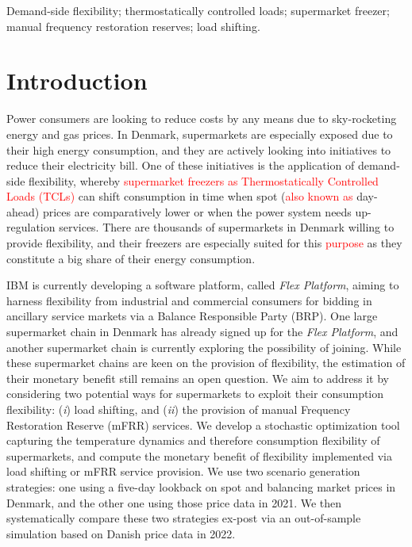 \documentclass[11pt,a4paper]{article}
\begin{document}
Demand-side flexibility; thermostatically controlled loads; supermarket freezer; manual frequency restoration reserves; load shifting.

\section{Introduction}


Power consumers are looking to reduce costs by any means due to sky-rocketing energy and gas prices. In Denmark, supermarkets are especially exposed due to their high energy consumption, and they are actively looking into initiatives to reduce their electricity bill. One of these initiatives is the application of demand-side flexibility, whereby \textcolor{red}{supermarket freezers as  Thermostatically Controlled Loads (TCLs)}  can shift consumption in time when spot (\textcolor{red}{also known as} day-ahead) prices are comparatively lower or when the power system needs up-regulation services. There are thousands of supermarkets in Denmark willing to provide flexibility, and their freezers are especially suited for this \textcolor{red}{purpose} as they constitute a big share of their energy consumption.

IBM is currently developing a software platform, called \textit{Flex Platform}, aiming to harness flexibility from industrial and commercial consumers for bidding in ancillary service markets via a Balance Responsible Party (BRP). One large supermarket chain in Denmark has already signed up for the \textit{Flex Platform}, and another supermarket chain is currently exploring the possibility of joining.
While these supermarket chains are keen on the provision of flexibility, the estimation of their monetary benefit still remains an open question. We aim to address it by considering two potential ways for supermarkets to exploit their consumption flexibility: (\textit{i}) load shifting, and (\textit{ii}) the provision of manual Frequency Restoration Reserve (mFRR)
services. We  develop  a stochastic optimization tool capturing the temperature dynamics and therefore consumption flexibility of supermarkets, and compute the monetary benefit of flexibility implemented via load shifting or mFRR service provision. We use two scenario generation  strategies: one using a five-day lookback on spot and balancing market prices in Denmark, and the other one using those price data in 2021. We then systematically compare these two strategies ex-post via an out-of-sample simulation based on Danish price data in 2022.
\end{document}
